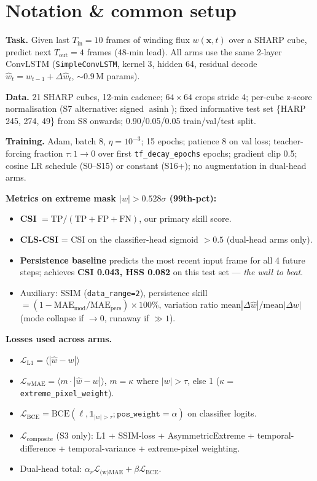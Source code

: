 \section{Notation \& common setup}

\textbf{Task.} Given last \(T_{\text{in}}=10\) frames of winding flux
\(w(\mathbf{x},t)\) over a SHARP cube, predict next \(T_{\text{out}}=4\)
frames (48-min lead). All arms use the same 2-layer ConvLSTM
(\texttt{SimpleConvLSTM}, kernel 3, hidden 64, residual decode
\(\hat w_t = w_{t-1} + \Delta\hat w_t\), \(\sim\)0.9\,M params).

\textbf{Data.} 21 SHARP cubes, 12-min cadence; \(64\!\times\!64\) crops
stride 4; per-cube z-score normalisation (S7 alternative: signed
\(\operatorname{asinh}\)); fixed informative test set
\{HARP 245, 274, 49\} from S8 onwards; 0.90/0.05/0.05
train/val/test split.

\textbf{Training.} Adam, batch 8, \(\eta=10^{-3}\); 15 epochs;
patience 8 on val loss; teacher-forcing fraction
\(\tau\!:\!1\!\to\!0\) over first \texttt{tf\_decay\_epochs} epochs;
gradient clip 0.5; cosine LR schedule (S0--S15) or constant (S16+);
no augmentation in dual-head arms.

\textbf{Metrics on extreme mask \(|w|>0.528\sigma\) (99th-pct):}
\begin{itemize}[leftmargin=14pt,itemsep=1pt,topsep=2pt]
\item \textbf{CSI} \(=\text{TP}/(\text{TP}+\text{FP}+\text{FN})\), our
      primary skill score.
\item \textbf{CLS-CSI} = CSI on the classifier-head sigmoid
      \(>\!0.5\) (dual-head arms only).
\item \textbf{Persistence baseline} predicts the most recent input
      frame for all 4 future steps; achieves
      \textbf{CSI 0.043, HSS 0.082} on this test set ---
      \emph{the wall to beat}.
\item Auxiliary: SSIM (\texttt{data\_range=2}), persistence skill
      \(=(1-\text{MAE}_{\text{mod}}/\text{MAE}_{\text{pers}})\!\times\!100\%\),
      variation ratio
      \(\text{mean}|\Delta\hat w|/\text{mean}|\Delta w|\) (mode collapse if
      \(\to 0\), runaway if \(\gg 1\)).
\end{itemize}

\textbf{Losses used across arms.}
\begin{itemize}[leftmargin=14pt,itemsep=1pt,topsep=2pt]
\item \(\mathcal{L}_{\text{L1}} = \langle |\hat w - w| \rangle\)
\item \(\mathcal{L}_{\text{wMAE}} = \langle m\!\cdot\!|\hat w - w| \rangle\),
      \(m{=}\kappa\) where \(|w|>\tau\), else 1
      (\(\kappa{=}\)\texttt{extreme\_pixel\_weight}).
\item \(\mathcal{L}_{\text{BCE}} =
      \text{BCE}(\ell, \mathbb{1}_{|w|>\tau};
      \texttt{pos\_weight}{=}\alpha)\) on classifier logits.
\item \(\mathcal{L}_{\text{composite}}\) (S3 only):
      L1 + SSIM-loss + AsymmetricExtreme + temporal-difference
      + temporal-variance + extreme-pixel weighting.
\item Dual-head total:
      \(\alpha_r\mathcal{L}_{\text{(w)MAE}} + \beta\mathcal{L}_{\text{BCE}}\).
\end{itemize}
